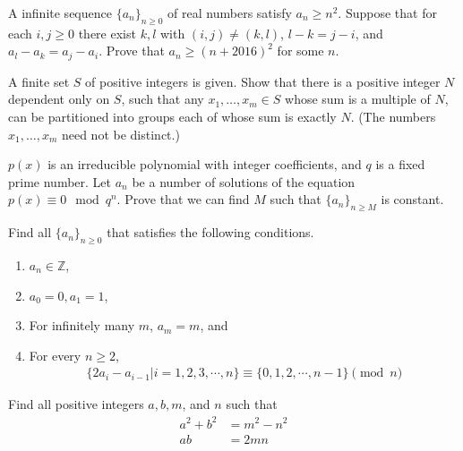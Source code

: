 \begin{problem}
	A infinite sequence $\{ a_n \}_{n \ge 0}$ of real numbers satisfy $a_n \ge n^2$. Suppose that for each $i, j \ge 0$ there exist $k, l$ with $(i,j) \neq (k,l)$, $l - k = j - i$, and $a_l - a_k = a_j - a_i$. Prove that $a_n \ge (n + 2016)^2$ for some $n$. %
\end{problem}

\begin{problem}
	A finite set $S$ of positive integers is given. Show that there is a positive integer $N$ dependent only on $S$, such that any $x_1, \dots, x_m \in S$ whose sum is a multiple of $N$, can be partitioned into groups each of whose sum is exactly $N$. (The numbers $x_1, \dots, x_m$ need not be distinct.) %
\end{problem}

\begin{problem}
	$p(x)$ is an irreducible polynomial with integer coefficients, and $q$ is a fixed prime number. Let $a_n$ be a number of solutions of the equation $p(x)\equiv 0\mod q^n$. Prove that we can find $M$ such that $\{a_n\}_{n\ge M}$ is constant. %
\end{problem}

\begin{problem}
	Find all $\{a_n\}_{n\ge 0}$ that satisfies the following conditions.
	\begin{enumerate}
		\item $a_n\in \mathbb{Z}$,
		\item $a_0=0, a_1=1$,
		\item For infinitely many $m$, $a_m=m$, and
		\item For every $n\ge2$,
			\begin{align*}
				\{2a_i-a_{i-1} | i=1, 2, 3, \cdots , n\}\equiv \{0, 1, 2, \cdots , n-1\}\pmod n
			\end{align*}
	\end{enumerate}
\end{problem}

\begin{problem}
	Find all positive integers $a, b, m$, and $n$ such that
	\begin{align*}
		a^2+b^2 &=m^2-n^2\\
		ab &=2mn
	\end{align*}
\end{problem}

